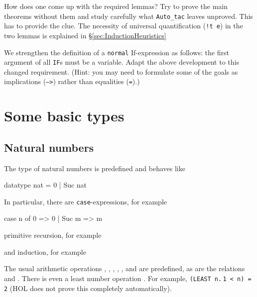 How does one come up with the required lemmas? Try to prove the main theorems
without them and study carefully what \texttt{Auto_tac} leaves unproved. This
has to provide the clue.
The necessity of universal quantification (\texttt{!t e}) in the two lemmas
is explained in \S\ref{sec:InductionHeuristics}

\begin{exercise}
  We strengthen the definition of a \texttt{normal} If-expression as follows:
  the first argument of all \texttt{IF}s must be a variable. Adapt the above
  development to this changed requirement. (Hint: you may need to formulate
  some of the goals as implications (\texttt{-->}) rather than equalities
  (\texttt{=}).)
\end{exercise}

\section{Some basic types}


\subsection{Natural numbers}

The type  of natural numbers is predefined and behaves like
\begin{ttbox}
datatype nat = 0 | Suc nat
\end{ttbox}
In particular, there are \texttt{case}-expressions, for example
\begin{ttbox}
case n of 0 => 0 | Suc m => m
\end{ttbox}
primitive recursion, for example
\begin{ttbox}
\end{ttbox}
and induction, for example
\begin{ttbox}
\ttbreak
{}
\end{ttbox}

The usual arithmetic operations \ttindexbold{+}, \ttindexbold{-},
\ttindexbold{*}, , ,  and
 are predefined, as are the relations \ttindexbold{<=} and
\ttindexbold{<}. There is even a least number operation .
For example, \texttt{(LEAST n.$\,$1 < n) = 2} (HOL does not prove this
completely automatically).

